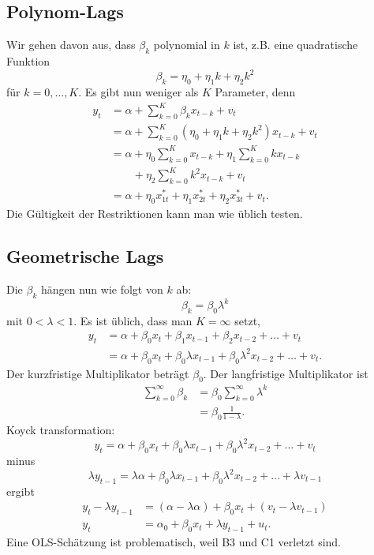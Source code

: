 \documentclass{article}
\begin{document}
\subsection*{Polynom-Lags}

Wir gehen davon aus, dass $\beta_{k}$ polynomial in $k$ ist, z.B.
eine quadratische Funktion
\begin{equation*}
\beta _{k}=\eta _{0}+\eta _{1}k+\eta _{2}k^{2}
\end{equation*}
für $k=0,\ldots ,K$. Es gibt nun weniger als $K$ Parameter, denn
\begin{align*}
y_{t} &=\alpha +\sum_{k=0}^{K}\beta _{k}x_{t-k}+v_{t} \\
&=\alpha +\sum_{k=0}^{K}\left( \eta _{0}+\eta _{1}k+\eta _{2}k^{2}\right)x_{t-k}+v_{t} \\
&=\alpha +\eta _{0}\sum_{k=0}^{K}x_{t-k}+\eta _{1}\sum_{k=0}^{K}kx_{t-k} \\
&\qquad +\eta _{2}\sum_{k=0}^{K}k^{2}x_{t-k}+v_{t} \\
&=\alpha +\eta _{0}x_{1t}^{\ast }+\eta _{1}x_{2t}^{\ast }+\eta_{2}x_{3t}^{\ast }+v_{t}.
\end{align*}
Die Gültigkeit der Restriktionen kann man wie üblich testen.

\subsection*{Geometrische Lags}

Die $\beta _{k}$ hängen nun wie folgt von $k$ ab:
\[ \beta _{k}=\beta _{0}\lambda ^{k} \]
mit $0<\lambda <1$. Es ist üblich, dass man $K=\infty $ setzt,
\begin{align*}
y_{t} &=\alpha +\beta _{0}x_{t}+\beta _{1}x_{t-1}+\beta _{2}x_{t-2}+\ldots+v_{t} \\
&=\alpha +\beta _{0}x_{t}+\beta _{0}\lambda x_{t-1}+\beta _{0}\lambda^{2}x_{t-2}+\ldots +v_{t}.
\end{align*}
Der kurzfristige Multiplikator beträgt $\beta _{0}$. Der
langfristige Multiplikator ist 
\begin{align*}
\sum_{k=0}^{\infty }\beta _{k} &=\beta _{0}\sum_{k=0}^{\infty }\lambda ^{k}\\
&=\beta _{0}\frac{1}{1-\lambda }.
\end{align*}
Koyck transformation: 
\[ y_{t}=\alpha +\beta _{0}x_{t}+\beta _{0}\lambda x_{t-1}
+\beta _{0}\lambda^{2}x_{t-2}+\ldots +v_{t} \]
minus
\[ \lambda y_{t-1}=\lambda \alpha +\beta _{0}\lambda x_{t-1}
+\beta _{0}\lambda^{2}x_{t-2}+\ldots +\lambda v_{t-1} \]
ergibt 
\begin{align*}
y_{t}-\lambda y_{t-1} &=\left( \alpha -\lambda \alpha \right) +\beta
_{0}x_{t}+\left( v_{t}-\lambda v_{t-1}\right) \\
y_{t} &=\alpha _{0}+\beta _{0}x_{t}+\lambda y_{t-1}+u_{t}.
\end{align*}
Eine OLS-Schätzung ist problematisch, weil B3 und C1 verletzt sind.
\end{document}
